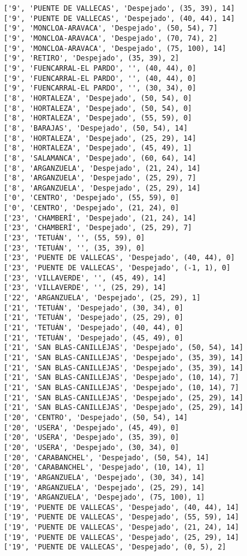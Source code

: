 \documentclass[11pt]{article}
\begin{document}
\begin{Verbatim}[commandchars=\\\{\}]
['9', 'PUENTE DE VALLECAS', 'Despejado', (35, 39), 14]
['9', 'PUENTE DE VALLECAS', 'Despejado', (40, 44), 14]
['9', 'MONCLOA-ARAVACA', 'Despejado', (50, 54), 7]
['9', 'MONCLOA-ARAVACA', 'Despejado', (70, 74), 2]
['9', 'MONCLOA-ARAVACA', 'Despejado', (75, 100), 14]
['9', 'RETIRO', 'Despejado', (35, 39), 2]
['9', 'FUENCARRAL-EL PARDO', '', (40, 44), 0]
['9', 'FUENCARRAL-EL PARDO', '', (40, 44), 0]
['9', 'FUENCARRAL-EL PARDO', '', (30, 34), 0]
['8', 'HORTALEZA', 'Despejado', (50, 54), 0]
['8', 'HORTALEZA', 'Despejado', (50, 54), 0]
['8', 'HORTALEZA', 'Despejado', (55, 59), 0]
['8', 'BARAJAS', 'Despejado', (50, 54), 14]
['8', 'HORTALEZA', 'Despejado', (25, 29), 14]
['8', 'HORTALEZA', 'Despejado', (45, 49), 1]
['8', 'SALAMANCA', 'Despejado', (60, 64), 14]
['8', 'ARGANZUELA', 'Despejado', (21, 24), 14]
['8', 'ARGANZUELA', 'Despejado', (25, 29), 7]
['8', 'ARGANZUELA', 'Despejado', (25, 29), 14]
['0', 'CENTRO', 'Despejado', (55, 59), 0]
['0', 'CENTRO', 'Despejado', (21, 24), 0]
['23', 'CHAMBERÍ', 'Despejado', (21, 24), 14]
['23', 'CHAMBERÍ', 'Despejado', (25, 29), 7]
['23', 'TETUÁN', '', (55, 59), 0]
['23', 'TETUÁN', '', (35, 39), 0]
['23', 'PUENTE DE VALLECAS', 'Despejado', (40, 44), 0]
['23', 'PUENTE DE VALLECAS', 'Despejado', (-1, 1), 0]
['23', 'VILLAVERDE', '', (45, 49), 14]
['23', 'VILLAVERDE', '', (25, 29), 14]
['22', 'ARGANZUELA', 'Despejado', (25, 29), 1]
['21', 'TETUÁN', 'Despejado', (30, 34), 0]
['21', 'TETUÁN', 'Despejado', (25, 29), 0]
['21', 'TETUÁN', 'Despejado', (40, 44), 0]
['21', 'TETUÁN', 'Despejado', (45, 49), 0]
['21', 'SAN BLAS-CANILLEJAS', 'Despejado', (50, 54), 14]
['21', 'SAN BLAS-CANILLEJAS', 'Despejado', (35, 39), 14]
['21', 'SAN BLAS-CANILLEJAS', 'Despejado', (35, 39), 14]
['21', 'SAN BLAS-CANILLEJAS', 'Despejado', (10, 14), 7]
['21', 'SAN BLAS-CANILLEJAS', 'Despejado', (10, 14), 7]
['21', 'SAN BLAS-CANILLEJAS', 'Despejado', (25, 29), 14]
['21', 'SAN BLAS-CANILLEJAS', 'Despejado', (25, 29), 14]
['20', 'CENTRO', 'Despejado', (50, 54), 14]
['20', 'USERA', 'Despejado', (45, 49), 0]
['20', 'USERA', 'Despejado', (35, 39), 0]
['20', 'USERA', 'Despejado', (30, 34), 0]
['20', 'CARABANCHEL', 'Despejado', (50, 54), 14]
['20', 'CARABANCHEL', 'Despejado', (10, 14), 1]
['19', 'ARGANZUELA', 'Despejado', (30, 34), 14]
['19', 'ARGANZUELA', 'Despejado', (25, 29), 14]
['19', 'ARGANZUELA', 'Despejado', (75, 100), 1]
['19', 'PUENTE DE VALLECAS', 'Despejado', (40, 44), 14]
['19', 'PUENTE DE VALLECAS', 'Despejado', (55, 59), 14]
['19', 'PUENTE DE VALLECAS', 'Despejado', (21, 24), 14]
['19', 'PUENTE DE VALLECAS', 'Despejado', (25, 29), 14]
['19', 'PUENTE DE VALLECAS', 'Despejado', (0, 5), 2]

\end{Verbatim}
\end{document}
